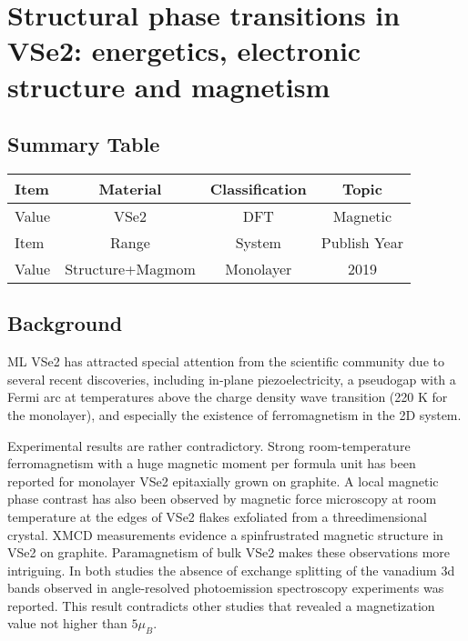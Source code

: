 \setchapterpreamble[u]{\margintoc}
\chapter{Structural phase transitions in VSe2: energetics, electronic structure and magnetism\cite{C9CP03726H}}

\section{Summary Table}

\begin{table}[h]
    \begin{tabular}{lccc}
    \hline
    Item  & Material         & Classification & Topic        \\  \hline
    Value & VSe2             & DFT            & Magnetic     \\  \hline
    Item  & Range            & System         & Publish Year \\  \hline
    Value & Structure+Magmom & Monolayer      & 2019         \\  \hline
    \end{tabular}
\end{table}

\section{Background}
ML VSe2 has attracted special attention from the scientific community due to several recent discoveries, including in-plane piezoelectricity, a pseudogap with a Fermi arc at temperatures above the charge density wave transition (220 K for the monolayer), and especially the existence of ferromagnetism in the 2D system. 

Experimental results are rather contradictory. Strong room-temperature ferromagnetism with a huge magnetic moment per formula unit has been reported for monolayer VSe2
epitaxially grown on graphite. A local magnetic phase contrast has also been observed by magnetic force microscopy at room temperature at the edges of VSe2 flakes exfoliated from a threedimensional crystal. XMCD measurements evidence a spinfrustrated magnetic structure in VSe2 on graphite. Paramagnetism of bulk VSe2 makes these observations more intriguing. In both studies the absence of exchange splitting of the vanadium 3d bands observed in angle-resolved photoemission spectroscopy experiments was reported. This result contradicts other studies that revealed a magnetization value not higher than $5 \mu_B$.


